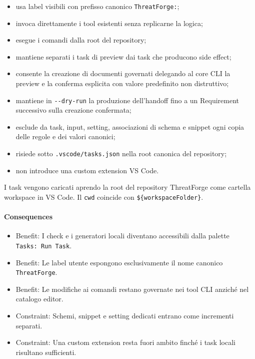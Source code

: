 \documentclass[
  10pt,
]{article}
\providecommand{\tightlist}{%
  \setlength{\itemsep}{0pt}\setlength{\parskip}{0pt}}
\begin{document}
\begin{itemize}
\tightlist
\item
  usa label visibili con prefisso canonico \texttt{ThreatForge:};
\item
  invoca direttamente i tool esistenti senza replicarne la logica;
\item
  esegue i comandi dalla root del repository;
\item
  mantiene separati i task di preview dai task che producono side
  effect;
\item
  consente la creazione di documenti governati delegando al core CLI la
  preview e la conferma esplicita con valore predefinito non
  distruttivo;
\item
  mantiene in \texttt{-\/-dry-run} la produzione dell'handoff fino a un
  Requirement successivo sulla creazione confermata;
\item
  esclude da task, input, setting, associazioni di schema e snippet ogni
  copia delle regole e dei valori canonici;
\item
  risiede sotto \texttt{.vscode/tasks.json} nella root canonica del
  repository;
\item
  non introduce una custom extension VS Code.
\end{itemize}

I task vengono caricati aprendo la root del repository ThreatForge come
cartella workspace in VS Code. Il \texttt{cwd} coincide con
\texttt{\$\{workspaceFolder\}}.

\paragraph{Consequences}\label{consequences-26}

\begin{itemize}
\tightlist
\item
  Benefit: I check e i generatori locali diventano accessibili dalla
  palette \texttt{Tasks:\ Run\ Task}.
\item
  Benefit: Le label utente espongono esclusivamente il nome canonico
  \texttt{ThreatForge}.
\item
  Benefit: Le modifiche ai comandi restano governate nei tool CLI
  anziché nel catalogo editor.
\item
  Constraint: Schemi, snippet e setting dedicati entrano come incrementi
  separati.
\item
  Constraint: Una custom extension resta fuori ambito finché i task
  locali risultano sufficienti.
\end{itemize}
\end{document}
